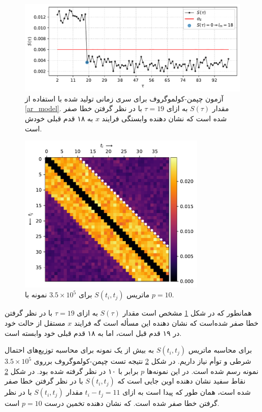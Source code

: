 \begin{figure}[H]
  \centering
  \includegraphics[width=\textwidth]{images/singleCKtestStat.pdf}
  \caption{آزمون چپمن-کولموگروف برای سری زمانی تولید شده با استفاده از \ref{ar_model}. مقدار $S(\tau)$ به ازای $\tau = 19$ با در نظر گرفتن خطا صفر شده است که نشان دهنده وابستگی فرایند $x$ به ۱۸ قدم قبلی خودش است.}
  \label{fig:ToyModelSingleCK}
\end{figure}
\begin{figure}[H]
    \centering
    \includegraphics[width=0.8\textwidth]{images/singleCKtest.pdf}
    \caption{ماتریس $S(t_i,t_j)$ برای $3.5 \times 10^5$ نمونه با $p=10$.}
    \label{fig:ToyModelCK}
\end{figure}

همانطور که در شکل \ref{fig:ToyModelSingleCK} مشخص است مقدار $S(\tau)$ به ازای $\tau = 19$ با در نظر گرفتن خطا صفر شده‌است که نشان دهنده 
این مسأله است گه فرایند $x$ مستقل از حالت خود در ۱۹ قدم قبل است، اما به ۱۸ قدم قبلی خود وابسته است.

برای محاسبه ماتریس $S( t_i, t_j )$ به بیش از یک نمونه برای محاسبه توزیع‌های احتمال شرطی و توأم نیاز داریم. 
در شکل \ref{fig:ToyModelCK} نتیجه تست چپمن-کولموگروف برروی $3.5 \times 10^5$ نمونه رسم شده است. در این نمونه‌ها $p$ برابر با ۱۰ در 
نظر گرفته شده بود. در شکل \ref{fig:ToyModelCK} نقاط سفید نشان دهنده اوین جایی است که $S( t_i, t_j )$ با در نظر گرفتن 
خطا صفر شده است، همان طور که پیدا است به ازای $t_i - t_j = 11$ مقدار $S( t_i, t_j )$ با در نظر گرفتن خطا صفر شده است. 
که نشان دهنده تخمین درست $p = 10$ است.
